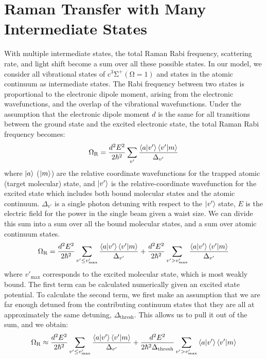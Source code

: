 \documentclass[aps,secnumarabic,amsmath,amssymb,10pt,superscriptaddress]{revtex4}
\begin{document}
\section{Raman Transfer with Many Intermediate States} \label{sm:sect_2}
With multiple intermediate states, the total Raman Rabi frequency, scattering rate, and light shift become a sum over all these possible states. In our model, we consider all vibrational states of $ \mathrm{c^3\Sigma^+(\Omega = 1)} $ and states in the atomic continuum as intermediate states. The Rabi frequency between two states is proportional to the electronic dipole moment, arising from the electronic wavefunctions, and the overlap of the vibrational wavefunctions. Under the assumption that the electronic dipole moment $ d $ is the same for all transitions between the ground state and the excited electronic state, the total Raman Rabi frequency becomes:
\begin{equation}
  \Omega_{\rm R} = \frac{d^2E^2}{2\hbar^2} \displaystyle\sum_{v'} \frac{\braket{a|v'}\braket{v'|m}}{\Delta_{v'}}
\end{equation}
where $\ket{a}$ ($\ket{m}$) are the relative coordinate wavefunctions for the trapped atomic (target molecular) state, and $\ket{v'}$ is the relative-coordinate wavefunction for the excited state which includes both bound molecular states and the atomic continuum. $\Delta_{v'}$ is a single photon detuning with respect to the $\ket{v'}$ state, $ E $ is the electric field for the power in the single beam given a waist size. We can divide this sum into a sum over all the bound molecular states, and a sum over atomic continuum states.
\begin{equation}
  \Omega_{\rm R} = \frac{d^2E^2}{2\hbar^2}\displaystyle\sum_{v' \leq v'_{\text{max}}} \frac{\braket{a|v'}\braket{v'|m}}{\Delta_{v'}} +  \frac{d^2E^2}{2\hbar^2}\displaystyle\sum_{v' > v'_{\text{max}}} \frac{\braket{a|v'}\braket{v'|m}}{\Delta_{v'}}
\end{equation}
where $ v'_{\text{max}}$ corresponds to the excited molecular state, which is most weakly bound. The first term can be calculated numerically given an excited state potential. To calculate the second term, we first make an assumption that we are far enough detuned from the contributing continuum states that they are all at approximately the same detuning, $ \Delta_{\text{thresh}}$. This allows us to pull it out of the sum, and we obtain:
\begin{equation}
  \Omega_{\rm R} \approx \frac{d^2E^2}{2\hbar^2}\displaystyle\sum_{v' \leq v'_{\text{max}}} \frac{\braket{a|v'}\braket{v'|m}}{\Delta_{v'}} +  \frac{d^2E^2}{2\hbar^2\Delta_{\text{thresh}}}\displaystyle\sum_{v' > v'_{\text{max}}} \braket{a|v'}\braket{v'|m}  \label{rabifreq}
\end{equation}
\end{document}
